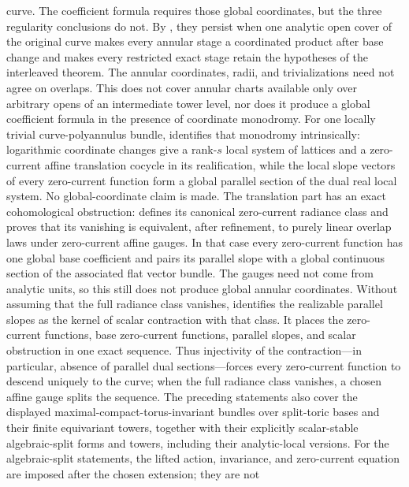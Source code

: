 curve.  The coefficient formula requires those global coordinates, but the
three regularity conclusions do not.  By
, they persist when
one analytic open cover of the original curve makes every annular stage a
coordinated product after base change and makes every restricted exact stage
retain the hypotheses of the interleaved theorem.  The annular coordinates,
radii, and trivializations need not agree on overlaps.  This does not cover
annular charts available only over arbitrary opens of an intermediate tower
level, nor does it produce a global coefficient formula in the presence of
coordinate monodromy.
For one locally trivial curve-polyannulus bundle,
 identifies that
monodromy intrinsically: logarithmic coordinate changes give a rank-\(s\)
local system of lattices and a zero-current affine translation cocycle in
its realification, while the local slope vectors of every zero-current
function form a global parallel section of the dual real local system.  No
global-coordinate claim is made.  The translation part has an exact
cohomological obstruction:
 defines its canonical
zero-current radiance class and proves that its vanishing is equivalent,
after refinement, to purely linear overlap laws under zero-current affine
gauges.  In that case every zero-current function has one global base
coefficient and pairs its parallel slope with a global continuous section
of the associated flat vector bundle.  The gauges need not come from
analytic units, so this still does not produce global annular coordinates.
Without assuming that the full radiance class vanishes,
 identifies the realizable
parallel slopes as the kernel of scalar contraction with that class.  It
places the zero-current functions, base zero-current functions, parallel
slopes, and scalar obstruction in one exact sequence.  Thus injectivity of
the contraction---in particular, absence of parallel dual sections---forces
every zero-current function to descend uniquely to the curve; when the full
radiance class vanishes, a chosen affine gauge splits the sequence.
The preceding statements also cover the displayed
maximal-compact-torus-invariant bundles over split-toric bases and their
finite equivariant towers, together with their explicitly scalar-stable
algebraic-split forms and towers, including their analytic-local versions.
For the algebraic-split statements, the lifted action, invariance, and
zero-current equation are imposed after the chosen extension; they are not
